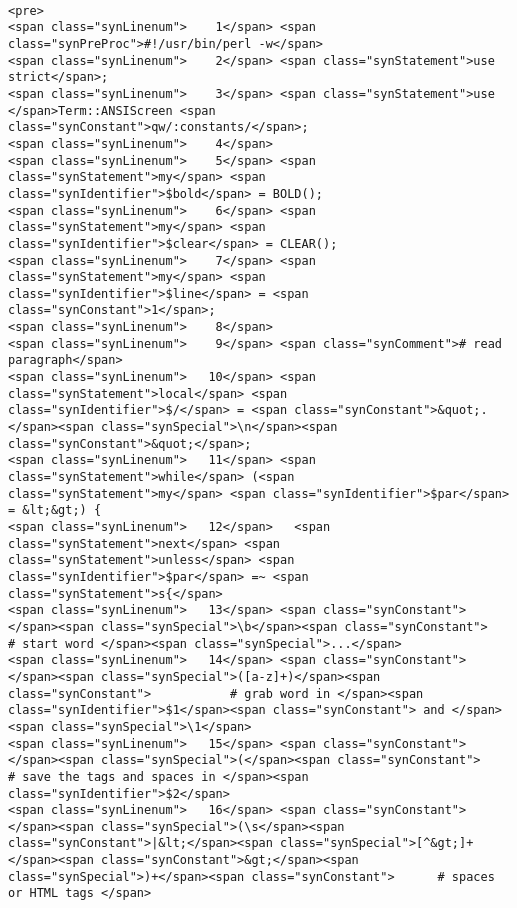 \begin{verbatim}

<pre>
<span class="synLinenum">    1</span> <span class="synPreProc">#!/usr/bin/perl -w</span>
<span class="synLinenum">    2</span> <span class="synStatement">use strict</span>;
<span class="synLinenum">    3</span> <span class="synStatement">use </span>Term::ANSIScreen <span class="synConstant">qw/:constants/</span>;
<span class="synLinenum">    4</span> 
<span class="synLinenum">    5</span> <span class="synStatement">my</span> <span class="synIdentifier">$bold</span> = BOLD();
<span class="synLinenum">    6</span> <span class="synStatement">my</span> <span class="synIdentifier">$clear</span> = CLEAR();
<span class="synLinenum">    7</span> <span class="synStatement">my</span> <span class="synIdentifier">$line</span> = <span class="synConstant">1</span>;
<span class="synLinenum">    8</span> 
<span class="synLinenum">    9</span> <span class="synComment"># read paragraph</span>
<span class="synLinenum">   10</span> <span class="synStatement">local</span> <span class="synIdentifier">$/</span> = <span class="synConstant">&quot;.</span><span class="synSpecial">\n</span><span class="synConstant">&quot;</span>;
<span class="synLinenum">   11</span> <span class="synStatement">while</span> (<span class="synStatement">my</span> <span class="synIdentifier">$par</span> = &lt;&gt;) {
<span class="synLinenum">   12</span>   <span class="synStatement">next</span> <span class="synStatement">unless</span> <span class="synIdentifier">$par</span> =~ <span class="synStatement">s{</span>
<span class="synLinenum">   13</span> <span class="synConstant">        </span><span class="synSpecial">\b</span><span class="synConstant">                 # start word </span><span class="synSpecial">...</span>
<span class="synLinenum">   14</span> <span class="synConstant">        </span><span class="synSpecial">([a-z]+)</span><span class="synConstant">           # grab word in </span><span class="synIdentifier">$1</span><span class="synConstant"> and </span><span class="synSpecial">\1</span>
<span class="synLinenum">   15</span> <span class="synConstant">        </span><span class="synSpecial">(</span><span class="synConstant">                  # save the tags and spaces in </span><span class="synIdentifier">$2</span>
<span class="synLinenum">   16</span> <span class="synConstant">        </span><span class="synSpecial">(\s</span><span class="synConstant">|&lt;</span><span class="synSpecial">[^&gt;]+</span><span class="synConstant">&gt;</span><span class="synSpecial">)+</span><span class="synConstant">      # spaces or HTML tags </span>

\end{verbatim}
